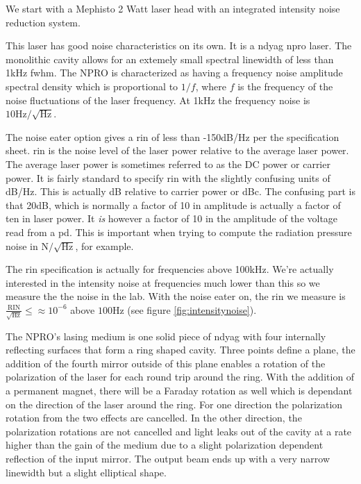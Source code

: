 We start with a Mephisto 2 Watt laser head with an integrated intensity
noise reduction system.

This laser has good noise characteristics on its own.
It is a \ac{ndyag} \ac{npro} laser. The monolithic cavity allows for an
extemely small spectral linewidth of less than 1kHz \ac{fwhm}.
The NPRO is characterized as having a frequency noise amplitude spectral
density which is proportional to $1/f$, where $f$ is the frequency
of the noise fluctuations of the laser frequency.
At 1kHz the frequency noise is $\mathrm{10Hz/\sqrt{Hz}}$.

The noise eater option gives a \ac{rin} of less than -150dB/Hz per the
specification sheet.
\ac{rin} is the noise level of the laser power relative to the average
laser power.
The average laser power is sometimes referred to as the DC power
or carrier power.
It is fairly standard to specify \ac{rin} with the slightly confusing
units of dB/Hz.
This is actually dB relative to carrier power or dBc.
The confusing part is that 20dB, which is normally a factor of 10
in amplitude is actually a factor of ten in laser power.
It \emph{is} however a factor of 10 in the amplitude of the voltage read
from a \ac{pd}.
This is important when trying to compute the radiation pressure noise
in $\mathrm{N/\sqrt{Hz}}$, for example.

The \ac{rin} specification is actually for frequencies above 100kHz.
We're actually interested in the intensity noise at frequencies
much lower than this so we measure the the noise in the lab.
With the noise eater on, the \ac{rin} we measure is
$\frac{\mathrm{RIN}}{\sqrt{\mathrm{Hz}}}\leq \approx 10^{-6}$
above $100\mathrm{Hz}$ (see figure \ref{fig:intensitynoise}).


The NPRO's lasing medium is one solid piece of \ac{ndyag} with four internally
reflecting surfaces that form a ring shaped cavity.
Three points define a plane, the addition of the fourth mirror outside of this
plane enables a rotation of the polarization of the laser for each round trip
around the ring.
With the addition of a permanent magnet, there will be a Faraday rotation as
well which is dependant on the direction of the laser around the ring.
For one direction the polarization rotation from the two effects are cancelled.
In the other direction, the polarization rotations are not cancelled and light
leaks out of the cavity at a rate higher than the gain of the medium due to a
slight polarization dependent reflection of the input mirror.
The output beam ends up with a very narrow linewidth but a slight elliptical
shape.

